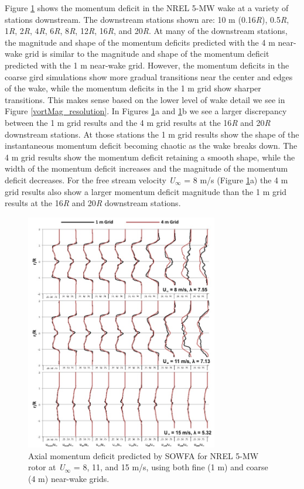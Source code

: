 Figure \ref{wakeDef_resolution} shows the momentum deficit in the NREL 5-MW wake at a variety of stations downstream. The downstream stations shown are: 10 m (0.16\emph{R}), 0.5\emph{R}, 1\emph{R}, 2\emph{R}, 4\emph{R}, 6\emph{R}, 8\emph{R}, 12\emph{R}, 16\emph{R}, and 20\emph{R}.  At many of the downstream stations, the magnitude and shape of the momentum deficits predicted with the 4 m near-wake grid is similar to the magnitude and shape of the momentum deficit predicted with the 1 m near-wake grid. However, the momentum deficits in the coarse gird simulations show more gradual transitions near the center and edges of the wake, while the momentum deficits in the 1 m grid show sharper transitions. This makes sense based on the lower level of wake detail we see in Figure \ref{vortMag_resolution}. In Figures \ref{wakeDef_resolution}a and \ref{wakeDef_resolution}b we see a larger discrepancy between the 1 m grid results and the 4 m grid results at the 16\emph{R} and 20\emph{R} downstream stations.  At those stations the 1 m grid results show the shape of the instantaneous momentum deficit becoming chaotic as the wake breaks down. The 4 m grid results show the momentum deficit retaining a smooth shape, while the width of the momentum deficit increases and the magnitude of the momentum deficit decreases. For the free stream velocity \emph{U$_\infty$} = 8 m/s (Figure \ref{wakeDef_resolution}a) the 4 m grid results also show a larger momentum deficit magnitude than the 1 m grid results at the 16\emph{R} and 20\emph{R} downstream stations.


\begin{figure}[htbp]
 \centering
 \includegraphics[width=0.75\textwidth]{Figures/ch5Figures/VelDef_resolution}
 \caption{ Axial momentum deficit predicted by SOWFA for NREL 5-MW rotor at \emph{U$_\infty$} = 8, 11, and 15 m/s, using both fine (1 m) and coarse (4 m) near-wake grids.}
 \label{wakeDef_resolution}
\end{figure}    





